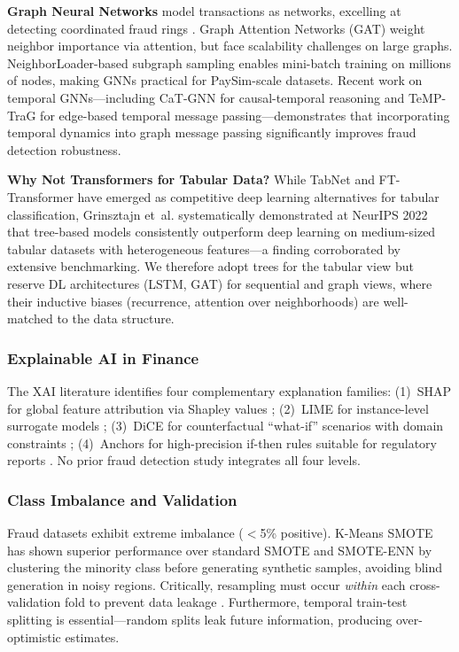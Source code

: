\documentclass[10pt,a4paper,twocolumn]{article}
\begin{document}
\textbf{Graph Neural Networks} model transactions as networks, excelling at detecting coordinated fraud rings \cite{liu2021}. Graph Attention Networks (GAT) \cite{velickovic2018} weight neighbor importance via attention, but face scalability challenges on large graphs. NeighborLoader-based subgraph sampling \cite{hamilton2017} enables mini-batch training on millions of nodes, making GNNs practical for PaySim-scale datasets. Recent work on temporal GNNs---including CaT-GNN \cite{catgnn2024} for causal-temporal reasoning and TeMP-TraG \cite{tempgraph2024} for edge-based temporal message passing---demonstrates that incorporating temporal dynamics into graph message passing significantly improves fraud detection robustness.

\textbf{Why Not Transformers for Tabular Data?} While TabNet and FT-Transformer have emerged as competitive deep learning alternatives for tabular classification, Grinsztajn et~al. \cite{grinsztajn2022} systematically demonstrated at NeurIPS 2022 that tree-based models consistently outperform deep learning on medium-sized tabular datasets with heterogeneous features---a finding corroborated by extensive benchmarking. We therefore adopt trees for the tabular view but reserve DL architectures (LSTM, GAT) for sequential and graph views, where their inductive biases (recurrence, attention over neighborhoods) are well-matched to the data structure.

\subsubsection{Explainable AI in Finance}

The XAI literature identifies four complementary explanation families: (1)~SHAP for global feature attribution via Shapley values \cite{lundberg2017}; (2)~LIME for instance-level surrogate models \cite{ribeiro2016}; (3)~DiCE for counterfactual ``what-if'' scenarios with domain constraints \cite{mothilal2020}; (4)~Anchors for high-precision if-then rules suitable for regulatory reports \cite{ribeiro2018}. No prior fraud detection study integrates all four levels.

\subsubsection{Class Imbalance and Validation}

Fraud datasets exhibit extreme imbalance ($<$5\% positive). K-Means SMOTE \cite{last2017} has shown superior performance over standard SMOTE \cite{chawla2002} and SMOTE-ENN by clustering the minority class before generating synthetic samples, avoiding blind generation in noisy regions. Critically, resampling must occur \emph{within} each cross-validation fold to prevent data leakage \cite{santos2018}. Furthermore, temporal train-test splitting is essential---random splits leak future information, producing over-optimistic estimates.
\end{document}

